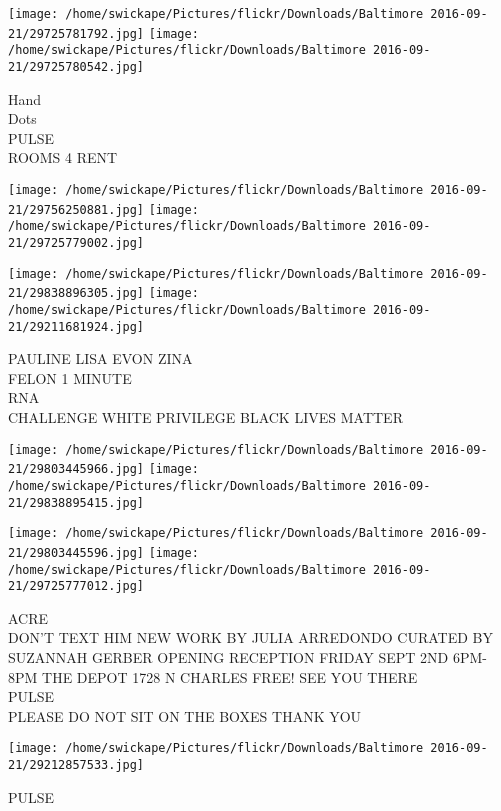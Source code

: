 \documentclass[10pt,letterpaper]{article}
\begin{document}
\texttt{[image: /home/swickape/Pictures/flickr/Downloads/Baltimore 2016-09-21/29725781792.jpg]}
\texttt{[image: /home/swickape/Pictures/flickr/Downloads/Baltimore 2016-09-21/29725780542.jpg]}

Hand\\
Dots\\
PULSE\\
ROOMS 4 RENT
\pagebreak

\texttt{[image: /home/swickape/Pictures/flickr/Downloads/Baltimore 2016-09-21/29756250881.jpg]}
\texttt{[image: /home/swickape/Pictures/flickr/Downloads/Baltimore 2016-09-21/29725779002.jpg]}

\texttt{[image: /home/swickape/Pictures/flickr/Downloads/Baltimore 2016-09-21/29838896305.jpg]}
\texttt{[image: /home/swickape/Pictures/flickr/Downloads/Baltimore 2016-09-21/29211681924.jpg]}

PAULINE LISA EVON ZINA\\
FELON 1 MINUTE\\
RNA\\
CHALLENGE WHITE PRIVILEGE BLACK LIVES MATTER
\pagebreak

\texttt{[image: /home/swickape/Pictures/flickr/Downloads/Baltimore 2016-09-21/29803445966.jpg]}
\texttt{[image: /home/swickape/Pictures/flickr/Downloads/Baltimore 2016-09-21/29838895415.jpg]}

\texttt{[image: /home/swickape/Pictures/flickr/Downloads/Baltimore 2016-09-21/29803445596.jpg]}
\texttt{[image: /home/swickape/Pictures/flickr/Downloads/Baltimore 2016-09-21/29725777012.jpg]}

ACRE\\
DON'T TEXT HIM NEW WORK BY JULIA ARREDONDO CURATED BY SUZANNAH GERBER OPENING RECEPTION FRIDAY SEPT 2ND 6PM{-}8PM THE DEPOT 1728 N CHARLES FREE! SEE YOU THERE\\
PULSE\\
PLEASE DO NOT SIT ON THE BOXES THANK YOU
\pagebreak

\texttt{[image: /home/swickape/Pictures/flickr/Downloads/Baltimore 2016-09-21/29212857533.jpg]}

PULSE
\pagebreak
\end{document}
